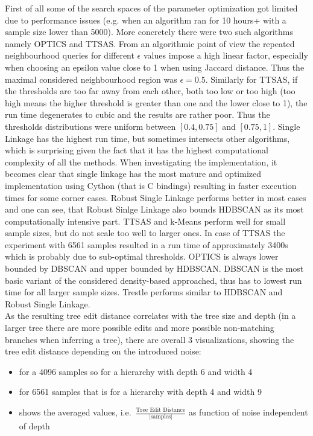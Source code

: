 \noindent First of all some of the search spaces of the parameter optimization got limited due to performance issues (e.g. when an algorithm ran for 10 hours+ with a sample size lower than 5000). More concretely there were two such algorithms namely OPTICS and TTSAS. From an algorithmic point of view the repeated neighbourhood queries for different $\epsilon$ values impose a high linear factor, especially when choosing an epsilon value close to 1 when using Jaccard distance. Thus the maximal considered neighbourhood region was $\epsilon = 0.5$. Similarly for TTSAS, if the thresholds are too far away from each other, both too low or too high (too high means the higher threshold is greater than one and the lower close to 1), the run time degenerates to cubic and the results are rather poor. Thus the thresholds distributions were uniform between $[0.4, 0.75]$ and $[0.75, 1]$. Single Linkage has the highest run time, but sometimes intersects other algorithms, which is surprising given the fact that it has the highest computational complexity of all the methods. When investigating the implementation, it becomes clear that single linkage has the most mature and optimized implementation using Cython (that is C bindings) resulting in faster execution times for some corner cases. Robust Single Linkage performs better in most cases and one can see, that Robust Sinlge Linkage also bounds HDBSCAN as its most computationally intensive part. TTSAS and k-Means perform well for small sample sizes, but do not scale too well to larger ones. In case of TTSAS the experiment with 6561 samples resulted in a run time of approximately 3400s which is probably due to sub-optimal thresholds. OPTICS is always lower bounded by DBSCAN and upper bounded by HDBSCAN. DBSCAN is the most basic variant of the considered density-based approached, thus has to lowest run time for all larger sample sizes. Trestle performs similar to HDBSCAN and Robust Single Linkage. \\


\noindent As the resulting tree edit distance correlates with the tree size and depth (in a larger tree there are more possible edits and more possible non-matching branches when inferring a tree), there are overall 3 visualizations, showing the tree edit distance depending on the introduced noise: 
\begin{itemize}
    \item {} for a 4096 samples so for a hierarchy with depth 6 and width 4
    \item {} for 6561 samples that is for a hierarchy with depth 4 and width 9
    \item {} shows the averaged values, i.e.~$\frac{\text{Tree Edit Distance}}{|\text{samples}|}$ as function of noise independent of depth %
\end{itemize}


